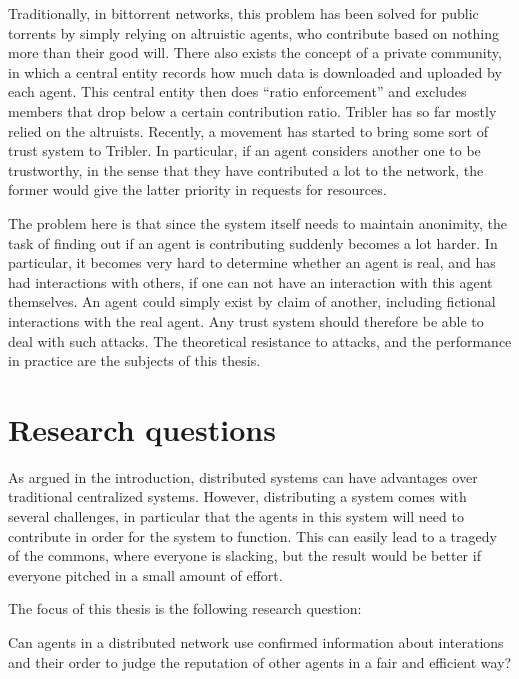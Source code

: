 \documentclass[a4paper,11pt]{book}
\theoremstyle{definition}
\begin{document}
Traditionally, in bittorrent networks, this problem has been solved for public torrents
by simply relying on altruistic agents, who contribute based on nothing more than
their good will. There also exists the concept of a private community, in which a central
entity records how much data is downloaded and uploaded by each agent. This central
entity then does ``ratio enforcement'' and excludes members that drop below a certain
contribution ratio. Tribler has so far mostly relied on the altruists. 
Recently, a movement has started to bring some sort of trust system to Tribler. In particular,
if an agent considers another one to be trustworthy, in the sense that they have contributed
a lot to the network, the former would give the latter priority in requests for resources.

The problem here is that since the system itself needs to maintain anonimity, the task of
finding out if an agent is contributing suddenly becomes a lot harder. In particular, 
it becomes very hard to determine whether an agent is real, and has had interactions with
others, if one can not have an interaction with this agent themselves. An agent could simply
exist by claim of another, including fictional interactions with the real agent. Any trust system
should therefore be able to deal with such attacks. The theoretical resistance to attacks,
and the performance in practice are the subjects of this thesis.



\chapter{Research questions}

As argued in the introduction, distributed systems can have advantages over traditional centralized
systems. However, distributing a system comes with several challenges, in particular that
the agents in this system will need to contribute in order for the system to
function. This can easily lead to a tragedy of the commons, where everyone is slacking,
but the result would be better if everyone pitched in a small amount of effort.

The focus of this thesis is the following research question:

\begin{center}
    Can agents in a distributed network use confirmed information about
    interations and their order to judge the reputation of other agents
    in a fair and efficient way?
\end{center}
\end{document}
